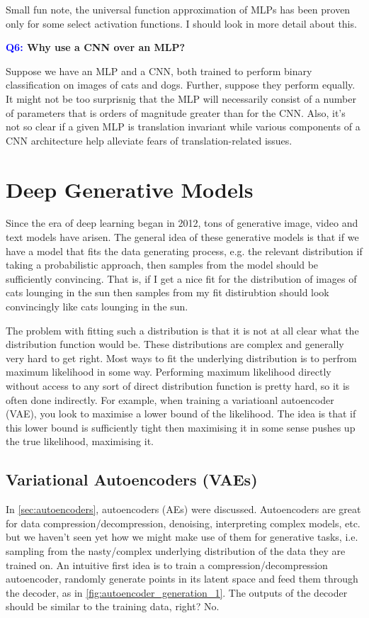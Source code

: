 \documentclass[11pt]{article}
\begin{document}
Small fun note, the universal function approximation of MLPs has been proven only for some select activation functions. I should look in more detail about this.

\begin{center}
    \textbf{\textcolor{blue}{Q6:} Why use a CNN over an MLP?}
\end{center}
Suppose we have an MLP and a CNN, both trained to perform binary classification on images of cats and dogs. Further, suppose they perform equally. It might not be too surprisnig that the MLP will necessarily consist of a number of parameters that is orders of magnitude greater than for the CNN. Also, it's not so clear if a given MLP is translation invariant while various components of a CNN architecture help alleviate fears of translation-related issues.

\section{Deep Generative Models}

Since the era of deep learning began in 2012, tons of generative image, video and text models have arisen. The general idea of these generative models is that if we have a model that fits the data generating process, e.g. the relevant distribution if taking a probabilistic approach, then samples from the model should be sufficiently convincing. That is, if I get a nice fit for the distribution of images of cats lounging in the sun then samples from my fit distirubtion should look convincingly like cats lounging in the sun.

The problem with fitting such a distribution is that it is not at all clear what the distribution function would be. These distributions are complex and generally very hard to get right. Most ways to fit the underlying distribution is to perfrom maximum likelihood in some way. Performing maximum likelihood directly without access to any sort of direct distribution function is pretty hard, so it is often done indirectly. For example, when training a variatioanl autoencoder (VAE), you look to maximise a lower bound of the likelihood. The idea is that if this lower bound is sufficiently tight then maximising it in some sense pushes up the true likelihood, maximising it.

\subsection{Variational Autoencoders (VAEs)}
In \autoref{sec:autoencoders}, autoencoders (AEs) were discussed. Autoencoders are great for data compression/decompression, denoising, interpreting complex models, etc. but we haven't seen yet how we might make use of them for generative tasks, i.e. sampling from the nasty/complex underlying distribution of the data they are trained on. An intuitive first idea is to train a compression/decompression autoencoder, randomly generate points in its latent space and feed them through the decoder, as in \autoref{fig:autoencoder_generation_1}. The outputs of the decoder should be similar to the training data, right? No.
\end{document}
